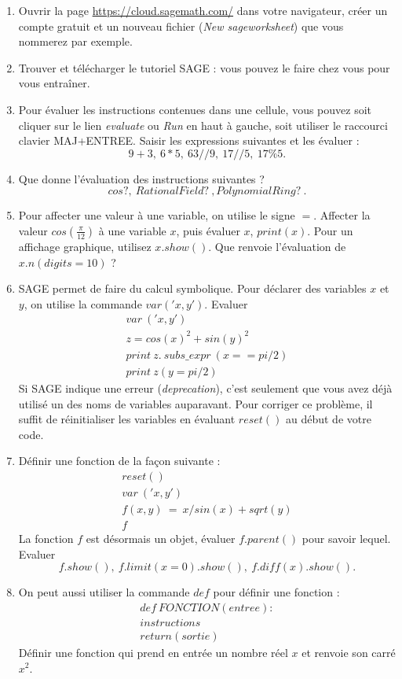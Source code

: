 \begin{enumerate}
\item Ouvrir la page \url{https://cloud.sagemath.com/} dans votre navigateur, créer un compte gratuit et un nouveau fichier (\textit{New sageworksheet}) que vous nommerez  par exemple.
\item Trouver et télécharger le tutoriel SAGE : vous pouvez le faire chez vous pour vous entraîner.
\item Pour évaluer les instructions contenues dans une cellule, vous pouvez soit cliquer sur le lien \textit{evaluate} ou \textit{Run} en haut à gauche, soit utiliser le raccourci clavier MAJ+ENTREE. Saisir les expressions suivantes et les évaluer :
\[9+3,\ 6*5,\ 63//9,\ 17//5,\ 17\%5.\]
\item Que donne l'évaluation des instructions suivantes ?
\[cos?,\ RationalField? \ , PolynomialRing? \ .\] 
\item Pour affecter une valeur à une variable, on utilise le signe $=$. Affecter la valeur $cos(\frac{\pi}{12})$ à une variable $x$, puis évaluer $x$, $print(x)$. Pour un affichage graphique, utilisez $x.show()$. Que renvoie l'évaluation de $x.n(digits=10)$  ?
\item SAGE permet de faire du calcul symbolique. Pour déclarer des variables $x$ et $y$, on utilise la commande $var('x,y')$. Evaluer
\[\begin{array}{l}
var\ ('x,y') \\
z = cos (x )^2 + sin (y )^2 \\
print\ z.\ subs\_expr\ (x== pi /2)\\
print \ z(y=pi /2)
\end{array}\]
Si SAGE indique une erreur (\textit{deprecation}), c'est seulement que vous avez déjà utilisé un des noms de variables auparavant. Pour corriger ce problème, il suffit de réinitialiser les variables en évaluant $reset()$ au début de votre code.
\item Définir une fonction de la façon suivante :
\[\begin{array}{l}
reset ()\\
var\ ('x,y') \\
f(x,y) \ = \ x/ sin (x) + sqrt (y) \\
f
\end{array}\]
La fonction $f$ est désormais un objet, évaluer $f.parent()$ pour savoir lequel. Evaluer \[f. show (), \  f. limit (x =0). show (),\ f. diff (x). show ().\]
\item On peut aussi utiliser la commande $def$ pour définir une fonction : 
\[\begin{array}{l}
def\ FONCTION(entree):\\
instructions\\
return(sortie)
\end{array}
\]
Définir une fonction qui prend en entrée un nombre réel $x$ et renvoie son carré $x^2$.

\end{enumerate}
